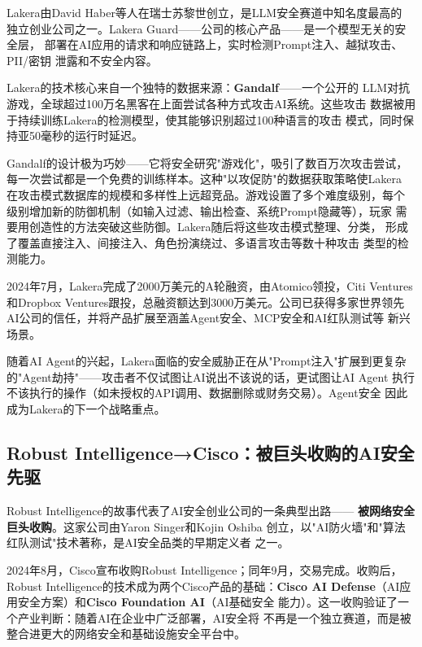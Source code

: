 Lakera由David Haber等人在瑞士苏黎世创立，是LLM安全赛道中知名度最高的
独立创业公司之一。Lakera Guard——公司的核心产品——是一个模型无关的安全层，
部署在AI应用的请求和响应链路上，实时检测Prompt注入、越狱攻击、PII/密钥
泄露和不安全内容。

Lakera的技术核心来自一个独特的数据来源：\textbf{Gandalf}——一个公开的
LLM对抗游戏，全球超过100万名黑客在上面尝试各种方式攻击AI系统。这些攻击
数据被用于持续训练Lakera的检测模型，使其能够识别超过100种语言的攻击
模式，同时保持亚50毫秒的运行时延迟。

Gandalf的设计极为巧妙——它将安全研究"游戏化"，吸引了数百万次攻击尝试，
每一次尝试都是一个免费的训练样本。这种"以攻促防"的数据获取策略使Lakera
在攻击模式数据库的规模和多样性上远超竞品。游戏设置了多个难度级别，每个
级别增加新的防御机制（如输入过滤、输出检查、系统Prompt隐藏等），玩家
需要用创造性的方法突破这些防御。Lakera随后将这些攻击模式整理、分类，
形成了覆盖直接注入、间接注入、角色扮演绕过、多语言攻击等数十种攻击
类型的检测能力。

2024年7月，Lakera完成了2000万美元的A轮融资，由Atomico领投，Citi Ventures
和Dropbox Ventures跟投，总融资额达到3000万美元。公司已获得多家世界领先
AI公司的信任，并将产品扩展至涵盖Agent安全、MCP安全和AI红队测试等
新兴场景。

随着AI Agent的兴起，Lakera面临的安全威胁正在从"Prompt注入"扩展到更复杂
的"Agent劫持"——攻击者不仅试图让AI说出不该说的话，更试图让AI Agent
执行不该执行的操作（如未授权的API调用、数据删除或财务交易）。Agent安全
因此成为Lakera的下一个战略重点。

\subsection{Robust Intelligence→Cisco：被巨头收购的AI安全先驱}
\label{subsec:robust-intel}

Robust Intelligence的故事代表了AI安全创业公司的一条典型出路——
\textbf{被网络安全巨头收购}。这家公司由Yaron Singer和Kojin Oshiba
创立，以"AI防火墙"和"算法红队测试"技术著称，是AI安全品类的早期定义者
之一。

2024年8月，Cisco宣布收购Robust Intelligence；同年9月，交易完成。收购后，
Robust Intelligence的技术成为两个Cisco产品的基础：\textbf{Cisco AI
Defense}（AI应用安全方案）和\textbf{Cisco Foundation AI}（AI基础安全
能力）。这一收购验证了一个产业判断：随着AI在企业中广泛部署，AI安全将
不再是一个独立赛道，而是被整合进更大的网络安全和基础设施安全平台中。

